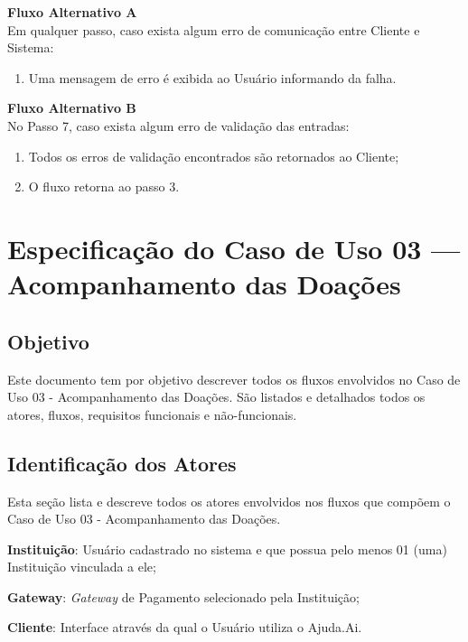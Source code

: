 \begin{anexosenv}
\begin{lista}
    \textbf{Fluxo Alternativo A} \\
    Em qualquer passo, caso exista algum erro de comunicação entre Cliente e Sistema:
    \begin{enumerate}
    \item Uma mensagem de erro é exibida ao Usuário informando da falha.
    \end{enumerate}
    
    \textbf{Fluxo Alternativo B} \\
    No Passo 7, caso exista algum erro de validação das entradas:
    \begin{enumerate}
    \item Todos os erros de validação encontrados são retornados ao Cliente;
    \item O fluxo retorna ao passo 3.
    \end{enumerate}
\end{lista}
\pagebreak

\section*{Especificação do Caso de Uso 03 --- Acompanhamento das Doações}
\subsection*{Objetivo}
Este documento tem por objetivo descrever todos os fluxos envolvidos no Caso de Uso 03 - Acompanhamento das Doações. São listados e detalhados todos os atores, fluxos, requisitos funcionais e não-funcionais.

\subsection*{Identificação dos Atores}
Esta seção lista e descreve todos os atores envolvidos nos fluxos que compõem o Caso de Uso 03 - Acompanhamento das Doações.
\begin{lista}
  \item \textbf{Instituição}: Usuário cadastrado no sistema e que possua pelo menos 01 (uma) Instituição vinculada a ele;
  \item \textbf{Gateway}: \emph{Gateway} de Pagamento selecionado pela Instituição;
  \item \textbf{Cliente}: Interface através da qual o Usuário utiliza o Ajuda.Ai.
\end{lista}


\end{anexosenv}

